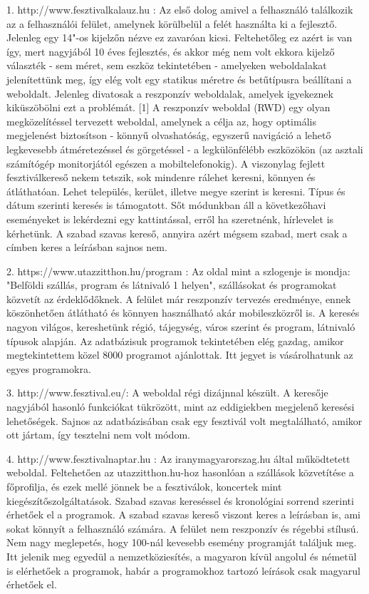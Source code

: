 \documentclass[11pt]{article}
\begin{document}
1. http://www.fesztivalkalauz.hu : Az első dolog amivel a felhasználó találkozik az a felhasználói felület, amelynek körülbelül a felét használta ki a fejlesztő. Jelenleg egy 14"-os kijelzőn nézve ez zavaróan kicsi. Feltehetőleg ez azért is van így, mert nagyjából 10 éves fejlesztés, és akkor még nem volt ekkora kijelző választék - sem méret, sem eszköz tekintetében - amelyeken weboldalakat jelenítettünk meg, így elég volt egy statikus méretre és betűtípusra beállítani a weboldalt. Jelenleg divatosak a reszponzív weboldalak, amelyek igyekeznek kiküszöbölni ezt a problémát.
[1] A reszponzív weboldal (RWD) egy olyan megközelítéssel tervezett weboldal, amelynek a célja az, hogy optimális megjelenést biztosítson - könnyű olvashatóság, egyszerű navigáció a lehető legkevesebb átméretezéssel és görgetéssel - a legkülönfélébb eszközökön (az asztali számítógép monitorjától egészen a mobiltelefonokig).
A viszonylag fejlett fesztiválkereső nekem tetszik, sok mindenre rálehet keresni, könnyen és átláthatóan.
Lehet település, kerület, illetve megye szerint is keresni. Típus és dátum szerinti keresés is támogatott. Sőt módunkban áll a következőhavi eseményeket is lekérdezni egy kattintással, erről ha szeretnénk, hírlevelet is kérhetünk. A szabad szavas kereső, annyira azért mégsem szabad, mert csak a címben keres a leírásban sajnos nem.

2. https://www.utazzitthon.hu/program : Az oldal mint a szlogenje is mondja: "Belföldi szállás, program és látnivaló 1 helyen", szállásokat és programokat közvetít az érdeklődőknek. A felület már reszponzív tervezés eredménye, ennek köszönhetően átlátható és könnyen használható akár mobileszközről is. A keresés nagyon világos, kereshetünk régió, tájegység, város szerint és program, látnivaló típusok alapján. Az adatbázisuk programok tekintetében elég gazdag, amikor megtekintettem közel 8000 programot ajánlottak. Itt jegyet is vásárolhatunk az egyes programokra.

3. http://www.fesztival.eu/: A weboldal régi dizájnnal készült. A keresője nagyjából hasonló funkciókat tükrözött, mint az eddigiekben megjelenő keresési lehetőségek. Sajnos az adatbázisában csak egy fesztivál volt megtalálható, amikor ott jártam, így tesztelni nem volt módom.

4. http://www.fesztivalnaptar.hu : Az iranymagyarorszag.hu által működtetett weboldal. Feltehetően az utazzitthon.hu-hoz hasonlóan a szállások közvetítése a főprofilja, és ezek mellé jönnek be a fesztiválok, koncertek mint kiegészítőszolgáltatások. Szabad szavas kereséssel és kronológiai sorrend szerinti érhetőek el a programok. A szabad szavas kereső viszont keres a leírásban is, ami sokat könnyít a felhasználó számára. A felület nem reszponzív és régebbi stílusú. Nem nagy meglepetés, hogy 100-nál kevesebb esemény programját találjuk meg. Itt jelenik meg egyedül a nemzetköziesítés, a magyaron kívül angolul és németül is elérhetőek a programok, habár a programokhoz tartozó leírások csak magyarul érhetőek el.
\end{document}
